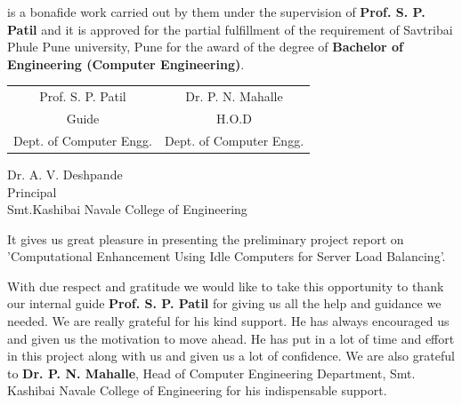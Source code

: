 \documentclass[oneside,a4paper,12pt]{book}
\begin{document}
is a bonafide work carried out by them under the supervision of \textbf{Prof. S. P. Patil} and it is approved for the partial fulfillment of the requirement of Savtribai Phule Pune university, Pune for the award of the degree of \textbf{Bachelor of Engineering (Computer Engineering)}.\\

\vspace*{2.0\baselineskip}

\bgroup
\def\arraystretch{0.7}

\vspace*{0.5\baselineskip}

\begin{tabular}{c c }
Prof. S. P. Patil &  \hspace{35 mm}Dr. P. N. Mahalle \\									
Guide   &  \hspace{35 mm} H.O.D \\
Dept. of Computer Engg.  &	\hspace{35 mm}Dept. of Computer Engg.  \\
\end{tabular}
\vspace*{0.5\baselineskip} 
\begin{center}
{
Dr. A. V. Deshpande \\
Principal\\
Smt.Kashibai Navale College of Engineering  
}
\end{center}
{   \setlength{\parindent}{11mm} }
{ \setlength{\parindent}{0mm} }
{
It gives us great pleasure in presenting the preliminary project report on 'Computational Enhancement Using Idle Computers for Server Load Balancing'.}\vspace*{1.0\baselineskip}

{With due respect and gratitude we would like to take this opportunity to thank our internal guide {\bfseries \fontsize{12}{12} \selectfont Prof. S. P. Patil} for giving us all the help and guidance we needed. We are really grateful for his kind support. He has always encouraged us and given us the motivation to move ahead. He has put in a lot of time and effort in this project along with us and given us a lot of confidence. We are also grateful to {\bfseries \fontsize{12}{12} \selectfont Dr. P. N. Mahalle}, Head of Computer Engineering Department, Smt. Kashibai Navale College of Engineering for his indispensable support.}\vspace*{1.0\baselineskip}
\end{document}
